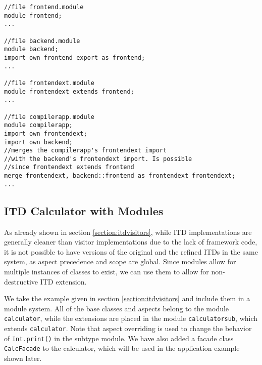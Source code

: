 \begin{lstlisting}[caption={Merge}]
//file frontend.module
module frontend;
...

//file backend.module
module backend;
import own frontend export as frontend;
...

//file frontendext.module
module frontendext extends frontend;
...

//file compilerapp.module
module compilerapp;
import own frontendext;
import own backend;
//merges the compilerapp's frontendext import 
//with the backend's frontendext import. Is possible
//since frontendext extends frontend
merge frontendext, backend::frontend as frontendext frontendext;
...
\end{lstlisting}

\subsection{ITD Calculator with Modules}

As already shown in section \ref{section:itdvisitors}, while ITD implementations
are generally cleaner than visitor implementations due to the lack of framework code,
it is not possible to have versions of the original and the refined
ITDs in the same system, as aspect precedence and scope are global. Since modules
allow for multiple instances of classes to exist, we can use them to allow for
non-destructive ITD extension. 

We take the example given in section \ref{section:itdvisitors} and include them in a module system.
All of the base classes and aspects belong to the module \texttt{calculator}, while the extensions
are placed in the module \texttt{calculatorsub}, which extends \texttt{calculator}. Note that
aspect overriding is used to change the behavior of \texttt{Int.print()} in the subtype module.
We have also added a facade class \texttt{CalcFacade} to the calculator, which will be used
in the application example shown later.

